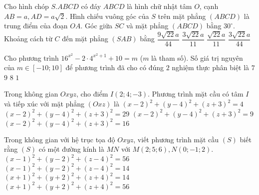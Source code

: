 \begin{ex}%
Cho hình chóp $S.ABCD$ có đáy $ABCD$ là hình chữ nhật tâm $O$, cạnh $AB=a, AD=a \sqrt{2}$. Hình chiếu vuông góc của $S$ trên mặt phẳng $(ABCD)$ là trung điểm của đoạn $OA$. Góc giữa $SC$ và mặt phẳng $(ABCD)$ bằng $30^{\circ}$. Khoảng cách từ $C$ đến mặt phẳng $(SAB)$ bằng
\choice
{$\dfrac{9\sqrt{22} a}{44}$}
{\True $\dfrac{3\sqrt{22} a}{11}$}
{$\dfrac{\sqrt{22} a}{11}$}
{$\dfrac{3\sqrt{22} a}{44}$}

\end{ex}
\begin{ex}%
Cho phương trình $16^{x^2}-2\cdot 4^{x^2+1}+10=m$ ($m$ là tham số). Số giá trị nguyên của $m \in[-10; 10]$ để phương trình đã cho có đúng $2$ nghiệm thực phân biệt là
\choice
{$7$}
{$9$}
{\True $8$}
{$1$}

\end{ex}
\begin{ex}%
Trong không gian $O x y z$, cho điểm $I(2; 4;-3)$. Phương trình mặt cầu có tâm $I$ và tiếp xúc với mặt phẳng $(O x z)$ là
\choice
{$(x-2)^2+(y-4)^2+(z+3)^2=4$}
{$(x-2)^2+(y-4)^2+(z+3)^2=29$}
{$(x-2)^2+(y-4)^2+(z+3)^2=9$}
{\True $(x-2)^2+(y-4)^2+(z+3)^2=16$}

\end{ex}
\begin{ex}%
{\vspace{-0.5cm}
}

\end{ex}
\begin{ex}%
Trong không gian với hệ trục tọa độ $O x y z$, viết phương trình mặt cầu $(S)$ biết rằng $(S)$ có một đường kính là $MN$ với $M(2; 5; 6), N(0;-1; 2)$.
\choice
{$(x-1)^2+(y-2)^2+(z-4)^2=56$}
{\True $(x-1)^2+(y-2)^2+(z-4)^2=14$}
{$(x+1)^2+(y+2)^2+(z+4)^2=14$}
{$(x+1)^2+(y+2)^2+(z+4)^2=56$}

\end{ex}

